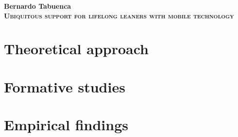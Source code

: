 \documentclass[a4paper,12pt,twoside,openright]{book}
\begin{document}
\nocite{*} %

\begin{titlepage}
	\null\vfill
	\center
		\Large
		\textbf{Bernardo Tabuenca}\\
		\vspace*{1em}
	\Huge
	\textbf{\textsc{Ubiquitous support for lifelong leaners with mobile technology}}\\
	\vfill\null
	
	\clearpage{\pagestyle{empty}\cleardoublepage}
\end{titlepage}
	
\frontmatter	
	\tableofcontents
	
	\cleardoublepage
	\listoffigures
	
	\cleardoublepage	
	\listoftables
	
	
	\clearpage{\pagestyle{empty}\cleardoublepage}
	\pagestyle{fancy}
	
\mainmatter
	
	
		\clearpage{\pagestyle{empty}\cleardoublepage}


	\part{Theoretical approach}
		
		
		
		\clearpage{\pagestyle{empty}\cleardoublepage}	
		
	\part{Formative studies}
		
		
				
		\clearpage{\pagestyle{empty}\cleardoublepage}	
	
	\part{Empirical findings}
		
		
		\clearpage{\pagestyle{empty}\cleardoublepage}	

\backmatter

	\renewcommand{\bibname}{References}
	
	\clearpage{\pagestyle{empty}\cleardoublepage}

	\appendix
		
		
		
	\clearpage{\pagestyle{empty}\cleardoublepage}
	\clearpage{\pagestyle{empty}\cleardoublepage}
\end{document}
